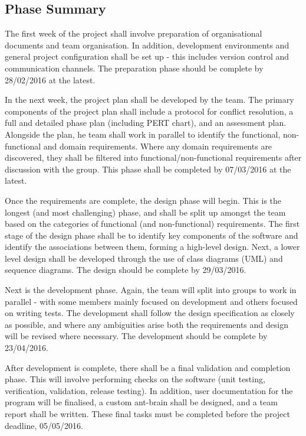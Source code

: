 \documentclass[11pt]{article}
\begin{document}
\subsection{Phase Summary}

The first week of the project shall involve preparation of organisational documents and team organisation. In addition, development environments and general project configuration shall be set up - this includes version control and communication channels. The preparation phase should be complete by 28/02/2016 at the latest.

In the next week, the project plan shall be developed by the team. The primary components of the project plan shall include a protocol for conflict resolution, a full and detailed phase plan (including PERT chart), and an assessment plan. Alongside the plan, he team shall work in parallel to identify the functional, non-functional and domain requirements. Where any domain requirements are discovered, they shall be filtered into functional/non-functional requirements after discussion with the group. This phase shall be completed by 07/03/2016 at the latest.

Once the requirements are complete, the design phase will begin. This is the longest (and most challenging) phase, and shall be split up amongst the team based on the categories of functional (and non-functional) requirements. The first stage of the design phase shall be to identify key components of the software and identify the associations between them, forming a high-level design. Next, a lower level design shall be developed through the use of class diagrams (UML) and sequence diagrams. The design should be complete by 29/03/2016.

Next is the development phase. Again, the team will split into groups to work in parallel - with some members mainly focused on development and others focused on writing tests. The development shall follow the design specification as closely as possible, and where any ambiguities arise both the requirements and design will be revised where necessary. The development should be complete by 23/04/2016.

After development is complete, there shall be a final validation and completion phase. This will involve performing checks on the software (unit testing, verification, validation, release testing). In addition, user documentation for the program will be finalised, a custom ant-brain shall be designed, and a team report shall be written. These final tasks must be completed before the project deadline, 05/05/2016.
\end{document}
